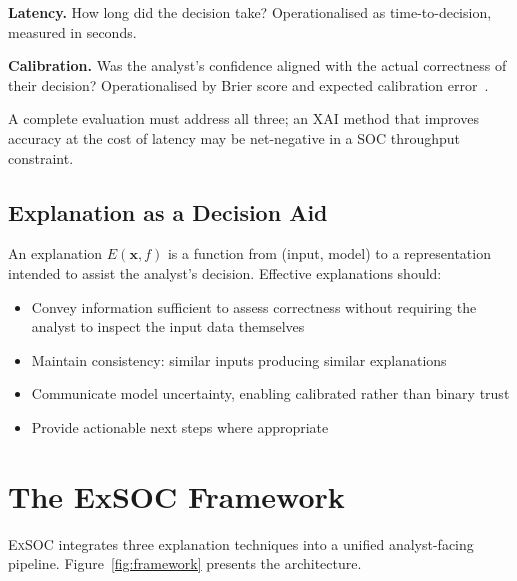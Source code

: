 \documentclass[sigconf,nonacm]{acmart}
\begin{document}
\textbf{Latency.} How long did the decision take? Operationalised as
time-to-decision, measured in seconds.

\textbf{Calibration.} Was the analyst's confidence aligned with the actual
correctness of their decision? Operationalised by Brier score and expected
calibration error~\cite{schemmer2023ai}.

A complete evaluation must address all three; an XAI method that improves
accuracy at the cost of latency may be net-negative in a SOC throughput
constraint.

\subsection{Explanation as a Decision Aid}

An explanation $E(\mathbf{x}, f)$ is a function from (input, model) to a
representation intended to assist the analyst's decision. Effective
explanations should:

\begin{itemize}
  \item Convey information sufficient to assess correctness without
        requiring the analyst to inspect the input data themselves
  \item Maintain consistency: similar inputs producing similar
        explanations
  \item Communicate model uncertainty, enabling calibrated rather than
        binary trust
  \item Provide actionable next steps where appropriate
\end{itemize}

\section{The ExSOC Framework}
\label{sec:framework}

\textsc{ExSOC} integrates three explanation techniques into a unified
analyst-facing pipeline. Figure~\ref{fig:framework} presents the
architecture.
\end{document}
